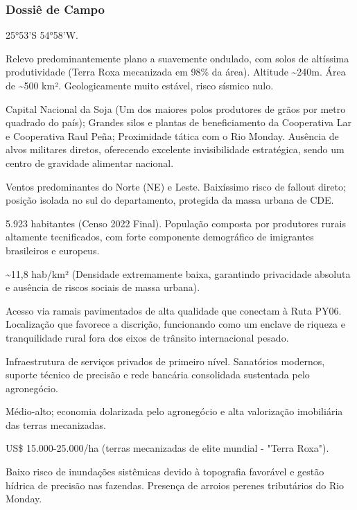 \subsubsection{Dossiê de Campo}
\begin{description}[style=nextline,leftmargin=0.5cm,font=\bfseries]
\item[Coordenadas]  25°53'S 54°58'W.
\item[Topografia]  Relevo predominantemente plano a suavemente ondulado, com solos de altíssima produtividade (Terra Roxa mecanizada em 98\% da área). Altitude \textasciitilde 240m. Área de \textasciitilde 500 km². Geologicamente muito estável, risco sísmico nulo.
\item[Alvos Estratégicos]  Capital Nacional da Soja (Um dos maiores polos produtores de grãos por metro quadrado do país); Grandes silos e plantas de beneficiamento da Cooperativa Lar e Cooperativa Raul Peña; Proximidade tática com o Rio Monday. Ausência de alvos militares diretos, oferecendo excelente invisibilidade estratégica, sendo um centro de gravidade alimentar nacional.
\item[Fallout]  Ventos predominantes do Norte (NE) e Leste. Baixíssimo risco de fallout direto; posição isolada no sul do departamento, protegida da massa urbana de CDE.
\item[População]  5.923 habitantes (Censo 2022 Final). População composta por produtores rurais altamente tecnificados, com forte componente demográfico de imigrantes brasileiros e europeus.
\item[Densidade]  \textasciitilde 11,8 hab/\allowbreak km² (Densidade extremamente baixa, garantindo privacidade absoluta e ausência de riscos sociais de massa urbana).
\item[Vias de Acesso]  Acesso via ramais pavimentados de alta qualidade que conectam à Ruta PY06. Localização que favorece a discrição, funcionando como um enclave de riqueza e tranquilidade rural fora dos eixos de trânsito internacional pesado.
\item[Serviços]  Infraestrutura de serviços privados de primeiro nível. Sanatórios modernos, suporte técnico de precisão e rede bancária consolidada sustentada pelo agronegócio.
\item[Custo de Vida]  Médio-alto; economia dolarizada pelo agronegócio e alta valorização imobiliária das terras mecanizadas.
\item[Preço da Terra]  US\$ 15.000-25.000/\allowbreak ha (terras mecanizadas de elite mundial - "Terra Roxa").
\item[Hidrologia]  Baixo risco de inundações sistêmicas devido à topografia favorável e gestão hídrica de precisão nas fazendas. Presença de arroios perenes tributários do Rio Monday.

\end{description}
